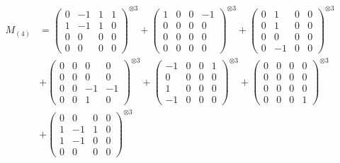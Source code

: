 \documentclass{article}
\newcommand{\Mthree}{%
    M_{(4)}
}
\begin{document}
        \newpage
        
        \footnotesize{
        \begin{align}
        \Mthree
        &= \label{Rs16-Rc11-Solution-31-c1} \begin{pmatrix} 0 & -1 & 1 & 1 \\ 1 & -1 & 1 & 0 \\ 0 & 0 & 0 & 0 \\ 0 & 0 & 0 & 0 \end{pmatrix}^{\otimes 3} 
            + \begin{pmatrix} 1 & 0 & 0 & -1 \\ 0 & 0 & 0 & 0 \\ 0 & 0 & 0 & 0 \\ 0 & 0 & 0 & 0 \end{pmatrix}^{\otimes 3} 
            + \begin{pmatrix} 0 & 1 & 0 & 0 \\ 0 & 1 & 0 & 0 \\ 0 & 0 & 0 & 0 \\ 0 & -1 & 0 & 0 \end{pmatrix}^{\otimes 3} \\
        &+ \label{Rs16-Rc11-Solution-31-c4} \begin{pmatrix} 0 & 0 & 0 & 0 \\ 0 & 0 & 0 & 0 \\ 0 & 0 & -1 & -1 \\ 0 & 0 & 1 & 0 \end{pmatrix}^{\otimes 3} 
            + \begin{pmatrix} -1 & 0 & 0 & 1 \\ 0 & 0 & 0 & 0 \\ 1 & 0 & 0 & 0 \\ -1 & 0 & 0 & 0 \end{pmatrix}^{\otimes 3} 
            + \begin{pmatrix} 0 & 0 & 0 & 0 \\ 0 & 0 & 0 & 0 \\ 0 & 0 & 0 & 0 \\ 0 & 0 & 0 & 1 \end{pmatrix}^{\otimes 3} \\
        &+ \label{Rs16-Rc11-Solution-31-c7} \begin{pmatrix} 0 & 0 & 0 & 0 \\ 1 & -1 & 1 & 0 \\ 1 & -1 & 0 & 0 \\ 0 & 0 & 0 & 0 \end{pmatrix}^{\otimes 3} 

\end{align}}
\end{document}
